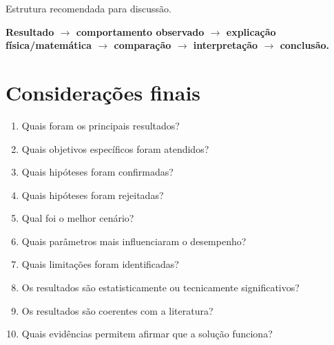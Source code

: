 {Estrutura recomendada para discussão.}

\begin{center}
	\textbf{
		Resultado
		$\rightarrow$
		comportamento observado
		$\rightarrow$
		explicação física/matemática
		$\rightarrow$
		comparação
		$\rightarrow$
		interpretação
		$\rightarrow$
		conclusão.
	}
\end{center}

\section{Considerações finais}

\begin{enumerate}
	\item Quais foram os principais resultados?
	\item Quais objetivos específicos foram atendidos?
	\item Quais hipóteses foram confirmadas?
	\item Quais hipóteses foram rejeitadas?
	\item Qual foi o melhor cenário?
	\item Quais parâmetros mais influenciaram o desempenho?
	\item Quais limitações foram identificadas?
	\item Os resultados são estatisticamente ou tecnicamente significativos?
	\item Os resultados são coerentes com a literatura?
	\item Quais evidências permitem afirmar que a solução funciona?
\end{enumerate}
